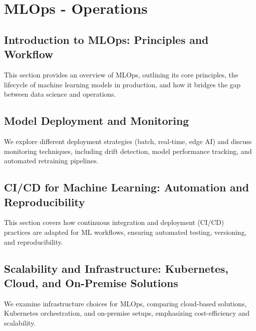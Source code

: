 \chapter{MLOps - Operations}

\section{Introduction to MLOps: Principles and Workflow}
This section provides an overview of MLOps, outlining its core principles, the lifecycle of machine learning models in production, and how it bridges the gap between data science and operations.

\section{Model Deployment and Monitoring}
We explore different deployment strategies (batch, real-time, edge AI) and discuss monitoring techniques, including drift detection, model performance tracking, and automated retraining pipelines.

\section{CI/CD for Machine Learning: Automation and Reproducibility}
This section covers how continuous integration and deployment (CI/CD) practices are adapted for ML workflows, ensuring automated testing, versioning, and reproducibility.

\section{Scalability and Infrastructure: Kubernetes, Cloud, and On-Premise Solutions}
We examine infrastructure choices for MLOps, comparing cloud-based solutions, Kubernetes orchestration, and on-premise setups, emphasizing cost-efficiency and scalability.


